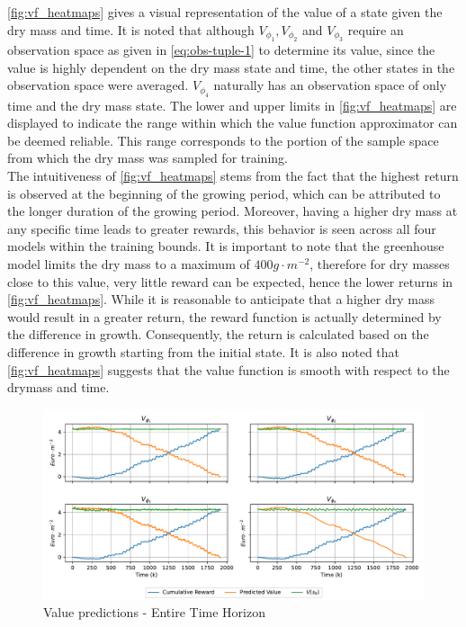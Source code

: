 \autoref{fig:vf_heatmaps} gives a visual representation of the value of a state given the dry mass and time. It is noted that although $V_{\phi_1},V_{\phi_2}$ and $V_{\phi_3}$ require an observation space as given in \autoref{eq:obs-tuple-1} to determine its value, since the value is highly dependent on the dry mass state and time, the other states in the observation space were averaged. $V_{\phi_4}$ naturally has an observation space of only time and the dry mass state. The lower and upper limits in \autoref{fig:vf_heatmaps} are displayed to indicate the range within which the value function approximator can be deemed reliable. This range corresponds to the portion of the sample space from which the dry mass was sampled for training. \\
The intuitiveness of \autoref{fig:vf_heatmaps} stems from the fact that the highest return is observed at the beginning of the growing period, which can be attributed to the longer duration of the growing period. Moreover,  having a higher dry mass at any specific time leads to greater rewards, this behavior is seen across all four models within the training bounds. It is important to note that the greenhouse model limits the dry mass to a maximum of $400 g \cdot m^{-2}$, therefore for dry masses close to this value, very little reward can be expected, hence the lower returns in \autoref{fig:vf_heatmaps}. While it is reasonable to anticipate that a higher dry mass would result in a greater return, the reward function is actually determined by the difference in growth. Consequently, the return is calculated based on the difference in growth starting from the initial state. It is also noted that \autoref{fig:vf_heatmaps} suggests that the value function is smooth with respect to the drymass and time.


\begin{figure}[H]
	\centering
	\includegraphics[width = \textwidth]{figures/vf_time_predictions_long.pdf}
	\caption{Value predictions - Entire Time Horizon}
	\label{fig:tr_predictions_long}
\end{figure}

